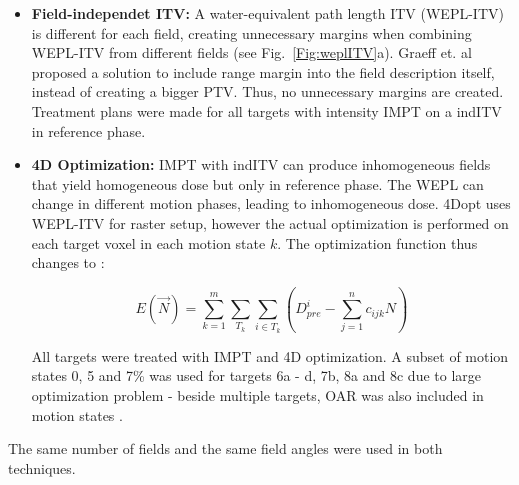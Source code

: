 \documentclass[type=dr, dr=rernat, accentcolor=tud7b,colorbacktitle, bigchapter, openright, twoside, 12pt ]{tudthesis}
\begin{document}
\begin{itemize}
\item \textbf{Field-independet ITV:} A water-equivalent path length ITV (WEPL-ITV) is different for each field, creating unnecessary margins when combining WEPL-ITV from different fields (see Fig.~\ref{Fig:weplITV}a). 
Graeff et. al \cite{Graeff2012} proposed a solution to include range margin into the field description itself, instead of creating a bigger PTV. 
Thus, no unnecessary margins are created. Treatment plans were made for all targets with intensity IMPT on a indITV in reference phase.

\item \textbf{4D Optimization:} IMPT with indITV can produce inhomogeneous fields that yield homogeneous dose but only in reference phase. The WEPL can change in different motion phases, leading to inhomogeneous dose.
4Dopt uses WEPL-ITV for raster setup, however the actual optimization is performed on each target voxel in each motion state $k$. The optimization function thus changes to \cite{Graeff2012}:

\begin{equation}
\label{eq-multiCost}
E(\vec{N}) = \sum_{k=1}^{m}\sum_{T_k} \sum_{i\in T_k} \left( D_{pre}^{i} -\sum_{j=1}^n c_{ijk}N\right)
\end{equation}

All targets were treated with IMPT and 4D optimization. A subset of motion states 0, 5 and 7\% was used for targets 6a - d, 7b, 8a and 8c due to large optimization problem - beside multiple targets, 
OAR was also included in motion states \cite{Graeff2012}.

\end{itemize}


The same number of fields and the same field angles were used in both techniques.
\end{document}
